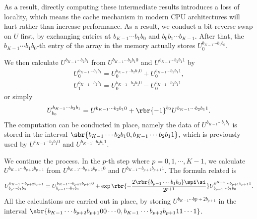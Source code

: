 \documentclass[english, nochinese]{pnote}
\begin{document}
As a result, directly computing these intermediate results introduces a loss of locality, which means the cache mechanism in modern CPU architectures will hurt rather than increase performance. As a result, we conduct a bit-reverse swap on $U$ first, by exchanging entries at $ b_{ K - 1 } \cdots b_1 b_0 $ and $ b_0 b_1 \cdots b_{ K - 1 } $. After that, the $ b_{ K - 1 } \cdots b_1 b_0 $-th entry of the array in the memory actually stores $ U^{ b_{ K - 1 } \cdots b_1 b_0 }_0 $.

We then calculate $ U^{ b_{ K - 1 } \cdots b_2 b_1 } $ from $ U^{ b_{ K - 1 } \cdots b_2 b_1 0 } $ and $ U^{ b_{ K - 1 } \cdots b_2 b_1 1 } $ by
\begin{gather}
U^{ b_{ K - 1 } \cdots b_2 b_1 }_0 = U^{ b_{ K - 1 } \cdots b_2 b_1 0 }_0 + U^{ b_{ K - 1 } \cdots b_2 b_1 1 }_0, \\
U^{ b_{ K - 1 } \cdots b_2 b_1 }_1 = U^{ b_{ K - 1 } \cdots b_2 b_1 0 }_0 - U^{ b_{ K - 1 } \cdots b_2 b_1 1 }_0
\end{gather}
or simply
\begin{equation}
U^{ b_{ K - 1 } \cdots b_2 b_1 }_{b_0} = U^{ b_{ K - 1 } \cdots b_2 b_1 0 } + \rbr{-1}^{b_0} U^{ b_{ K - 1 } \cdots b_2 b_1 1 }.
\end{equation}
The computation can be conducted in place, namely the data of $ U^{ b_{ K - 1 } \cdots b_2 b_1 } $ is stored in the interval $ \sbr{ b_{ K - 1 } \cdots b_2 b_1 0 , b_{ K - 1 } \cdots b_2 b_1 1 } $, which is previously used by $ U^{ b_{ K - 1 } \cdots b_2 b_1 0 } $ and $ U^{ b_{ K - 1 } \cdots b_2 b_1 1 } $.

We continue the process. In the $p$-th step where $ p = 0, 1, \cdots, K - 1 $, we calculate $ U^{ b_{ K - 1 } \cdots b_{ p + 2 } b_{ p + 1 } } $ from $ U^{ b_{ K - 1 } \cdots b_{ p + 2 } b_{ p + 1 } 0 } $ and $ U^{ b_{ K - 1 } \cdots b_{ p + 2 } b_{ p + 1 } 1 } $. The formula related is
\begin{equation} \label{Eq:FFT}
U^{ b_{ K - 1 } \cdots b_{ p + 2 } b_{ p + 1 } }_{ b_p \cdots b_1 b_0 } = U^{ b_{ K - 1 } \cdots b_{ p + 2 } b_{ p + 1 } 0 }_{ b_{ p - 1 } \cdots b_1 b_0 } + \exp \rbr{-\frac{ 2 \rbr{ b_{ p - 1 } \cdots b_1 b_0 } \spi \si }{2^{ p + 1 }}} U^{ b^{ K - 1 } \cdots b_{ p + 1 } b_{ p + 1 } 1 }_{ b_{ p - 1 } \cdots b_1 b_0 }.
\end{equation}
All the calculations are carried out in place, by storing $ U^{ b_{ K - 1 } \cdots b{ p + 2 } b_{ p + 1 } } $ in the interval $ \sbr{ b_{ K - 1 } \cdots b_{ p + 2 } b_{ p + 1 } 0 0 \cdots 0, b_{ K - 1 } \cdots b_{ p + 2 } b_{ p + 1 } 1 1 \cdots 1 } $.
\end{document}
